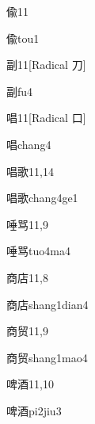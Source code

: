 \begin{entry}{偸}{11}
  \begin{phonetics}{偸}{tou1}
  \end{phonetics}
\end{entry}

\begin{entry}{副}{11}[Radical 刀]
  \begin{phonetics}{副}{fu4}
  \end{phonetics}
\end{entry}

\begin{entry}{唱}{11}[Radical ⼝]
  \begin{phonetics}{唱}{chang4}
  \end{phonetics}
\end{entry}

\begin{entry}{唱歌}{11,14}
  \begin{phonetics}{唱歌}{chang4ge1}
  \end{phonetics}
\end{entry}

\begin{entry}{唾骂}{11,9}
  \begin{phonetics}{唾骂}{tuo4ma4}
  \end{phonetics}
\end{entry}

\begin{entry}{商店}{11,8}
  \begin{phonetics}{商店}{shang1dian4}
  \end{phonetics}
\end{entry}

\begin{entry}{商贸}{11,9}
  \begin{phonetics}{商贸}{shang1mao4}
  \end{phonetics}
\end{entry}

\begin{entry}{啤酒}{11,10}
  \begin{phonetics}{啤酒}{pi2jiu3}
  \end{phonetics}
\end{entry}

